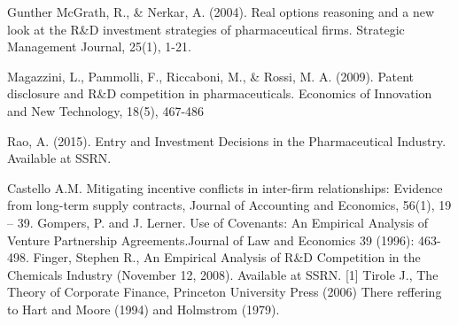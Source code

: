 \begin{thebibliography}{20}

 Gunther McGrath, R., \& Nerkar, A. (2004). Real options reasoning and a new look at the R\&D investment strategies of pharmaceutical firms. Strategic Management Journal, 25(1), 1-21.

 Magazzini, L., Pammolli, F., Riccaboni, M., \& Rossi, M. A. (2009). Patent disclosure and R\&D competition in pharmaceuticals. Economics of Innovation and New Technology, 18(5), 467-486

 Rao, A. (2015). Entry and Investment Decisions in the Pharmaceutical Industry. Available at SSRN.

 Castello A.M. Mitigating incentive conflicts in inter-firm relationships: Evidence from long-term supply contracts, Journal of Accounting and Economics, 56(1), 19 -- 39.
 Gompers, P. and J. Lerner. \grqq Use of Covenants: An Empirical Analysis of Venture Partnership Agreements.\grqq Journal of Law and Economics 39 (1996): 463-498.
 Finger, Stephen R., An Empirical Analysis of R\&D Competition in the Chemicals Industry (November 12, 2008). Available at SSRN.
[1] Tirole J., The Theory of Corporate Finance, Princeton University Press (2006) 
There reffering to Hart and Moore (1994) and Holmstrom (1979).
\end{thebibliography}